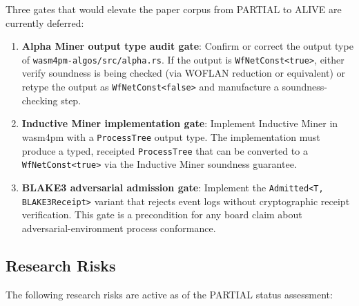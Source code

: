Three gates that would elevate the paper corpus from PARTIAL to ALIVE are
currently deferred:

\begin{enumerate}
  \item \textbf{Alpha Miner output type audit gate}: Confirm or correct the
    output type of \texttt{wasm4pm-algos/src/alpha.rs}. If the output is
    \texttt{WfNetConst<true>}, either verify soundness is being checked (via
    WOFLAN reduction or equivalent) or retype the output as
    \texttt{WfNetConst<false>} and manufacture a soundness-checking step.

  \item \textbf{Inductive Miner implementation gate}: Implement Inductive Miner
    in wasm4pm with a \texttt{ProcessTree} output type. The implementation must
    produce a typed, receipted \texttt{ProcessTree} that can be converted to a
    \texttt{WfNetConst<true>} via the Inductive Miner soundness guarantee.

  \item \textbf{BLAKE3 adversarial admission gate}: Implement the
    \texttt{Admitted<T, BLAKE3Receipt>} variant that rejects event logs without
    cryptographic receipt verification. This gate is a precondition for any
    board claim about adversarial-environment process conformance.
\end{enumerate}

\subsection{Research Risks}
\label{sec:sources-papers-open-risks}

The following research risks are active as of the PARTIAL status assessment:

